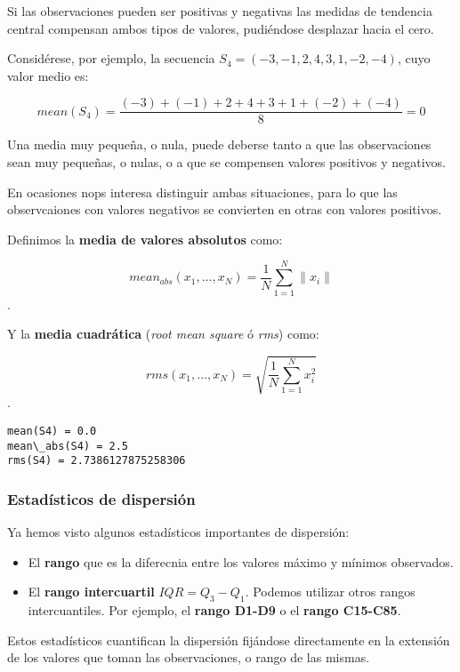 \documentclass[11pt]{article}
\providecommand{\tightlist}{%
      \setlength{\itemsep}{0pt}\setlength{\parskip}{0pt}}
\begin{document}
Si las observaciones pueden ser positivas y negativas las medidas de
tendencia central compensan ambos tipos de valores, pudiéndose desplazar
hacia el cero.

Considérese, por ejemplo, la secuencia
\(S_4 =\left(-3, -1, 2, 4, 3, 1, -2, -4 \right)\), cuyo valor medio es:

\[mean(S_4) = \frac{(-3) + (-1) + 2 + 4 + 3 + 1 + (-2) + (-4)}{8}= 0\]

Una media muy pequeña, o nula, puede deberse tanto a que las
observaciones sean muy pequeñas, o nulas, o a que se compensen valores
positivos y negativos.

En ocasiones nops interesa distinguir ambas situaciones, para lo que las
observcaiones con valores negativos se convierten en otras con valores
positivos.

    Definimos la \textbf{media de valores absolutos} como:

\[mean_{abs}(x_1,\ldots, x_N) = \frac{1}{N}\sum_{1=1}^N \|x_i\|\].

    Y la \textbf{media cuadrática} (\emph{root mean square} ó \emph{rms})
como:

\[rms(x_1,\ldots, x_N) = \sqrt{\frac{1}{N}\sum_{1=1}^N x_i^2}\].

    \begin{Verbatim}[commandchars=\\\{\}]
mean(S4) = 0.0
mean\_abs(S4) = 2.5
rms(S4) = 2.7386127875258306

    \end{Verbatim}

    \subsubsection*{Estadísticos de
dispersión}\label{estaduxedsticos-de-dispersiuxf3n}

Ya hemos visto algunos estadísticos importantes de dispersión:

\begin{itemize}
\tightlist
\item
  El \textbf{rango} que es la diferecnia entre los valores máximo y
  mínimos observados.
\item
  El \textbf{rango intercuartil} \(IQR = Q_3-Q_1\). Podemos utilizar
  otros rangos intercuantiles. Por ejemplo, el \textbf{rango D1-D9} o el
  \textbf{rango C15-C85}.
\end{itemize}

Estos estadísticos cuantifican la dispersión fijándose directamente en
la extensión de los valores que toman las observaciones, o rango de las
mismas.
\end{document}
